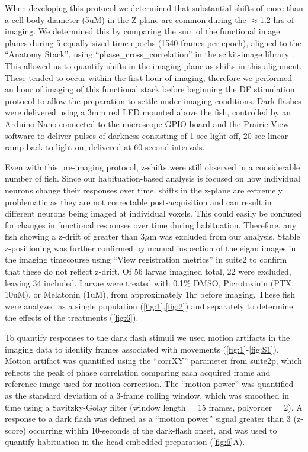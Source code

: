 \documentclass[9pt,lineno]{RandlettLab_elife}
\begin{document}
When developing this protocol we determined that substantial shifts of more than a cell-body diameter (5uM) in the Z-plane are common during the $\approx$1.2 hrs of imaging. We determined this by comparing the sum of the functional image planes during 5 equally sized time epochs (1540 frames per epoch), aligned to the “Anatomy Stack”, using “phase\_cross\_correlation” in the scikit-image library \citep{Van_der_Walt2014-hx}. This allowed us to quantify shifts in the imaging plane as shifts in this alignment.  These tended to occur within the first hour of imaging, therefore we performed an hour of imaging of this functional stack before beginning the DF stimulation protocol to allow the preparation to settle under imaging conditions. Dark flashes were delivered using a 3mm red LED mounted above the fish, controlled by an Arduino Nano connected to the microscope GPIO board and the Prairie View software to deliver pulses of darkness consisting of 1 sec light off, 20 sec linear ramp back to light on, delivered at 60 second intervals. 

Even with this pre-imaging protocol, z-shifts were still observed in a considerable number of fish. Since our habituation-based analysis is focused on how individual neurons change their responses over time, shifts in the z-plane are extremely problematic as they are not correctable post-acquisition and can result in different neurons being imaged at individual voxels. This could easily be confused for changes in functional responses over time during habituation. Therefore, any fish showing a z-drift of greater than 3$\mu$m was excluded from our analysis. Stable z-positioning was further confirmed by manual inspection of the eigan images in the imaging timecourse using “View registration metrics” in suite2 to confirm that these do not reflect z-drift. Of 56 larvae imagined total, 22 were excluded, leaving 34 included. Larvae were treated with 0.1\% DMSO, Picrotoxinin (PTX, 10uM), or Melatonin (1uM), from approximately 1hr before imaging. These fish were analyzed as a single population (\autoref{fig:1},\autoref{fig:2}) and separately to determine the effects of the treatments (\autoref{fig:6}). 

To quantify responses to the dark flash stimuli we used motion artifacts in the imaging data to identify frames associated with movements (\autoref{fig:1}-\autoref{fig:S1}). Motion artifact was quantified using the “corrXY” parameter from suite2p, which reflects the peak of phase correlation comparing each acquired frame and reference image used for motion correction. The “motion power” was quantified as the standard deviation of a 3-frame rolling window, which was smoothed in time using a Savitzky-Golay filter (window length = 15 frames, polyorder = 2). A response to a dark flash was defined as a “motion power” signal greater than 3 (z-score) occurring within 10-seconds of the dark-flash onset, and was used to quantify habituation in the head-embedded preparation (\autoref{fig:6}A). 
\end{document}
